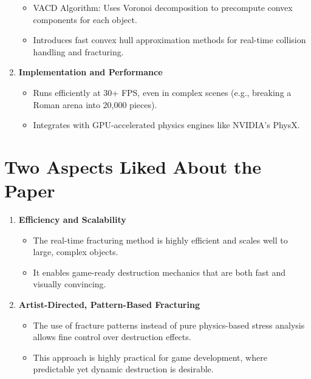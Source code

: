 \documentclass[12pt]{article}
\begin{document}
\begin{enumerate}[noitemsep]
    \begin{itemize}[noitemsep]
        \item VACD Algorithm: Uses Voronoi decomposition to precompute convex components for each object.
        \item Introduces fast convex hull approximation methods for real-time collision handling and fracturing.
    \end{itemize}
    \item \textbf{Implementation and Performance}
    \begin{itemize}[noitemsep]
        \item Runs efficiently at 30+ FPS, even in complex scenes (e.g., breaking a Roman arena into 20,000 pieces).
        \item Integrates with GPU-accelerated physics engines like NVIDIA's PhysX.
    \end{itemize}
\end{enumerate}

\section{Two Aspects Liked About the Paper}
\begin{enumerate}[noitemsep]
    \item \textbf{Efficiency and Scalability}
    \begin{itemize}[noitemsep]
        \item The real-time fracturing method is highly efficient and scales well to large, complex objects.
        \item It enables game-ready destruction mechanics that are both fast and visually convincing.
    \end{itemize}
    \item \textbf{Artist-Directed, Pattern-Based Fracturing}
    \begin{itemize}[noitemsep]
        \item The use of fracture patterns instead of pure physics-based stress analysis allows fine control over destruction effects.
        \item This approach is highly practical for game development, where predictable yet dynamic destruction is desirable.
    \end{itemize}
\end{enumerate}
\end{document}
